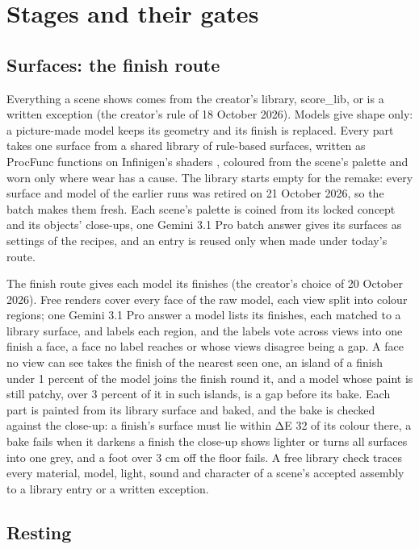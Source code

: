 \section{Stages and their gates}\label{stages-and-their-gates}

\subsection{Surfaces: the finish route}\label{surfaces-the-finish-route}

Everything a scene shows comes from the creator's library, score\_lib, or is a written exception (the creator's rule of 18 October 2026). Models give shape only: a picture-made model keeps its geometry and its finish is replaced. Every part takes one surface from a shared library of rule-based surfaces, written as ProcFunc functions \citep{raistrick2026procfunc} on Infinigen's shaders \citep{raistrick2023infinigen}, coloured from the scene's palette and worn only where wear has a cause. The library starts empty for the remake: every surface and model of the earlier runs was retired on 21 October 2026, so the batch makes them fresh. Each scene's palette is coined from its locked concept and its objects' close-ups, one Gemini 3.1 Pro batch answer gives its surfaces as settings of the recipes, and an entry is reused only when made under today's route.

The finish route gives each model its finishes (the creator's choice of 20 October 2026). Free renders cover every face of the raw model, each view split into colour regions; one Gemini 3.1 Pro answer a model lists its finishes, each matched to a library surface, and labels each region, and the labels vote across views into one finish a face, a face no label reaches or whose views disagree being a gap. A face no view can see takes the finish of the nearest seen one, an island of a finish under 1 percent of the model joins the finish round it, and a model whose paint is still patchy, over 3 percent of it in such islands, is a gap before its bake. Each part is painted from its library surface and baked, and the bake is checked against the close-up: a finish's surface must lie within ΔE 32 of its colour there, a bake fails when it darkens a finish the close-up shows lighter or turns all surfaces into one grey, and a foot over 3 cm off the floor fails. A free library check traces every material, model, light, sound and character of a scene's accepted assembly to a library entry or a written exception.

\subsection{Resting}\label{resting}

